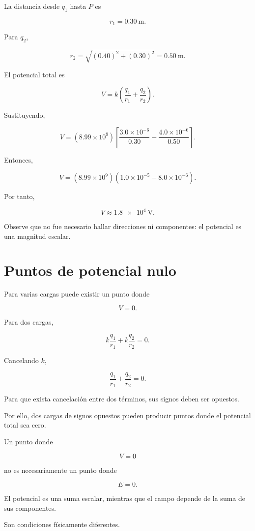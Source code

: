La distancia desde \(q_1\) hasta \(P\) es

\[
r_1=\SI{0.30}{\metre}.
\]

Para \(q_2\),

\[
r_2=\sqrt{(0.40)^2+(0.30)^2}
=\SI{0.50}{\metre}.
\]

El potencial total es

\[
V
=
k
\left(
\frac{q_1}{r_1}
+
\frac{q_2}{r_2}
\right).
\]

Sustituyendo,

\[
V
=
(8.99\times10^9)
\left[
\frac{3.0\times10^{-6}}{0.30}
-
\frac{4.0\times10^{-6}}{0.50}
\right].
\]

Entonces,

\[
V
=
(8.99\times10^9)
(1.0\times10^{-5}-8.0\times10^{-6}).
\]

Por tanto,

\[
\boxed{
V\approx\SI{1.8e4}{\volt}
}.
\]

Observe que no fue necesario hallar direcciones ni componentes: el potencial es una
magnitud escalar.


\section{Puntos de potencial nulo}

Para varias cargas puede existir un punto donde

\[
V=0.
\]

Para dos cargas,

\[
k\frac{q_1}{r_1}
+
k\frac{q_2}{r_2}
=0.
\]

Cancelando \(k\),

\begin{equation}
\boxed{
\frac{q_1}{r_1}
+
\frac{q_2}{r_2}
=0
}.
\end{equation}

Para que exista cancelación entre dos términos, sus signos deben ser opuestos.

Por ello, dos cargas de signos opuestos pueden producir puntos donde el potencial
total sea cero.


\begin{advertencia}

Un punto donde

\[
V=0
\]

no es necesariamente un punto donde

\[
E=0.
\]

El potencial es una suma escalar, mientras que el campo depende de la suma de sus
componentes.

Son condiciones físicamente diferentes.

\end{advertencia}


